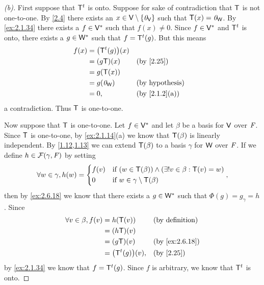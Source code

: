 \begin{proof}[(b)]
  First suppose that \({\mathsf{T}}^{t}\) is onto.
  Suppose for sake of contradiction that \(\mathsf{T}\) is not one-to-one.
  By \cref{2.4} there exists an \(x \in \mathsf{V} \setminus \left\lbrace\mathit{0}_{\mathsf{V}}\right\rbrace\) such that \(\mathsf{T}(x) = \mathit{0}_{\mathsf{W}}\).
  By \cref{ex:2.1.34} there exists a \(f \in \mathsf{V}^*\) such that \(f(x) \neq 0\).
  Since \(f \in \mathsf{V}^*\) and \({\mathsf{T}}^{t}\) is onto, there exists a \(g \in \mathsf{W}^*\) such that \(f = {\mathsf{T}}^{t}(g)\).
  But this means
  \begin{align*}
    f(x) & = \pa{\tp{\T}(g)}(x)                             \\
         & = (g \T)(x)          &  & \by{2.25}              \\
         & = g(\T(x))                                       \\
         & = g(\zv_{\W})        &  & \text{(by hypothesis)} \\
         & = 0,                 &  & \by{2.1.2}[a]
  \end{align*}
  a contradiction.
  Thus \(\mathsf{T}\) is one-to-one.

  Now suppose that \(\mathsf{T}\) is one-to-one.
  Let \(f \in \mathsf{V}^*\) and let \(\beta\) be a basis for \(\mathsf{V}\) over \(\mathit{F}\).
  Since \(\mathsf{T}\) is one-to-one, by \cref{ex:2.1.14}(a) we know that \(\mathsf{T}(\beta)\) is linearly independent.
  By \cref{1.12,1.13} we can extend \(\mathsf{T}(\beta)\) to a basis \(\gamma\) for \(\mathsf{W}\) over \(\mathit{F}\).
  If we define \(h \in \mathcal{F}(\gamma, \mathit{F})\) by setting
  \[
    \forall w \in \gamma, h(w) = \begin{dcases}
      f(v) & \text{if } (w \in \mathsf{T}(\beta)) \land (\exists! v \in \beta : \mathsf{T}(v) = w) \\
      0    & \text{if } w \in \gamma \setminus \mathsf{T}(\beta)
    \end{dcases},
  \]
  then by \cref{ex:2.6.18} we know that there exists a \(g \in \mathsf{W}^*\) such that \(\Phi(g) = g_{\gamma} = h\).
  Since
  \begin{align*}
    \forall v \in \beta, f(v) & = h(\T(v))            &  & \text{(by definition)} \\
                              & = (h \T)(v)                                       \\
                              & = (g \T)(v)           &  & \by{ex:2.6.18}         \\
                              & = \pa{\tp{\T}(g)}(v), &  & \by{2.25}
  \end{align*}
  by \cref{ex:2.1.34} we know that \(f = {\mathsf{T}}^{t}(g)\).
  Since \(f\) is arbitrary, we know that \({\mathsf{T}}^{t}\) is onto.
\end{proof}

